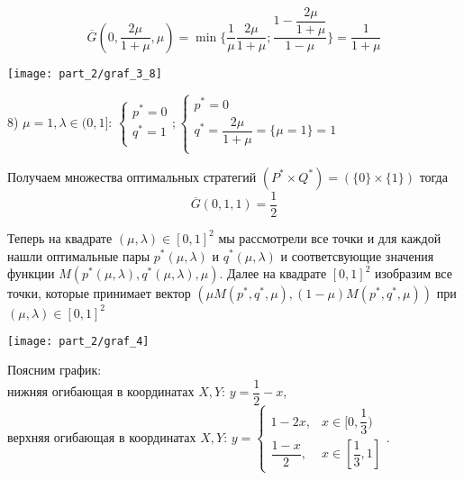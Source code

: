 $$
	\overline G(0, \dfrac{2\mu}{1 + \mu}, \mu)=
	\min \big\{
		\dfrac{1}{\mu}\dfrac{2\mu}{1 + \mu}; 
		\dfrac{1 - \dfrac{2\mu}{1 + \mu}}{1 - \mu}
	\big\} =
	\dfrac{1}{1 + \mu}
$$

\begin{center}
\texttt{[image: part\_2/graf\_3\_8]}
\end{center}

8) $\mu = 1, \lambda \in (0, 1] $: 
$
	\begin{cases}
		p^* = 0 \\
		q^* = 1 \\
	\end{cases};
	\begin{cases}
		p^* = 0 \\
		q^* = \dfrac{2\mu}{1 + \mu} = \{\mu = 1\} = 1 \\
	\end{cases}
$

\hfill \break
Получаем множества оптимальных стратегий 
$(P^* \times Q^*) =(\{0\} \times \{1\})$ тогда
$$
	\overline G(0, 1, 1) = \dfrac{1}{2}
$$
\vspace{40mm}

Теперь на квадрате $(\mu, \lambda) \in [0, 1]^2$ мы рассмотрели все точки
и для каждой нашли оптимальные пары $p^*(\mu, \lambda)$
и $q^*(\mu, \lambda)$ и соответсвующие значения функции 
$M(p^*(\mu, \lambda),q^*(\mu, \lambda),\mu)$. Далее на квадрате
$[0, 1]^{2}$ изобразим все точки, которые принимает вектор $(\mu M(p^*,q^*,\mu), (1-\mu) M(p^*,q^*,\mu))$ при
$(\mu, \lambda)\in[0, 1]^{2}$

\begin{center}
\texttt{[image: part\_2/graf\_4]}
\end{center}

Поясним график: \\
нижняя огибающая в координатах $X,Y$: $y=\dfrac{1}{2}-x$, \\
верхняя огибающая в координатах $X,Y$: 
$y=
\begin{cases}
	1 - 2x, & x \in [0, \dfrac{1}{3}) \\
	\dfrac{1 - x}{2}, & x \in [\dfrac{1}{3}, 1]
\end{cases}.
$
